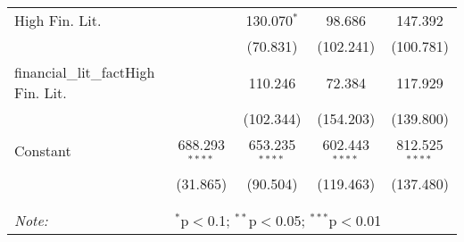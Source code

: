 \begin{table}[!htbp]
\begin{tabular}{@{\extracolsep{5pt}}lcccc}
  High Fin. Lit. &  & 130.070$^{*}$ & 98.686 & 147.392 \\ 
  &  & (70.831) & (102.241) & (100.781) \\ 
  financial\_lit\_factHigh Fin. Lit. &  & 110.246 & 72.384 & 117.929 \\ 
  &  & (102.344) & (154.203) & (139.800) \\ 
  Constant & 688.293$^{****}$ & 653.235$^{****}$ & 602.443$^{****}$ & 812.525$^{****}$ \\ 
  & (31.865) & (90.504) & (119.463) & (137.480) \\ 
 \hline \\[-1.8ex] 
\hline 
\hline \\[-1.8ex] 
\textit{Note:}  & \multicolumn{4}{l}{$^{*}$p$<$0.1; $^{**}$p$<$0.05; $^{***}$p$<$0.01} \\ 
\end{tabular} 
\end{table} 
